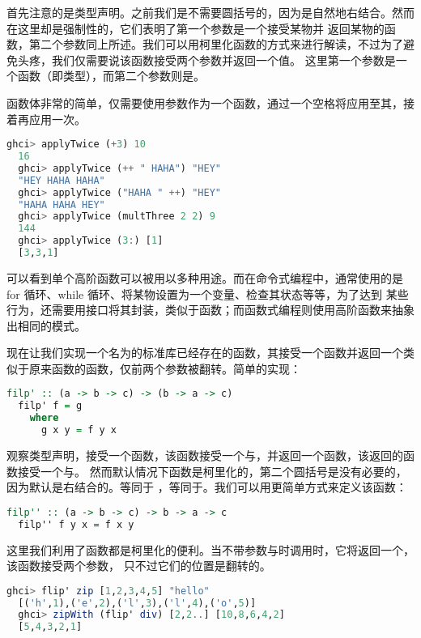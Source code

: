 \documentclass[./main.tex]{subfiles}
\begin{document}
首先注意的是类型声明。之前我们是不需要圆括号的，因为\acode{->}是自然地右结合。然而在这里却是强制性的，它们表明了第一个参数是一个接受某物并
返回某物的函数，第二个参数同上所述。我们可以用柯里化函数的方式来进行解读，不过为了避免头疼，我们仅需要说该函数接受两个参数并返回一个值。
这里第一个参数是一个函数（即类型），而第二个参数则是。

函数体非常的简单，仅需要使用参数作为一个函数，通过一个空格将应用至其，接着再应用一次。

\begin{lstlisting}[language=Haskell]
  ghci> applyTwice (+3) 10
  16
  ghci> applyTwice (++ " HAHA") "HEY"
  "HEY HAHA HAHA"
  ghci> applyTwice ("HAHA " ++) "HEY"
  "HAHA HAHA HEY"
  ghci> applyTwice (multThree 2 2) 9
  144
  ghci> applyTwice (3:) [1]
  [3,3,1]
\end{lstlisting}

可以看到单个高阶函数可以被用以多种用途。而在命令式编程中，通常使用的是 for 循环、while 循环、将某物设置为一个变量、检查其状态等等，为了达到
某些行为，还需要用接口将其封装，类似于函数；而函数式编程则使用高阶函数来抽象出相同的模式。

现在让我们实现一个名为的标准库已经存在的函数，其接受一个函数并返回一个类似于原来函数的函数，仅前两个参数被翻转。简单的实现：

\begin{lstlisting}[language=Haskell]
  filp' :: (a -> b -> c) -> (b -> a -> c)
  filp' f = g
    where
      g x y = f y x
\end{lstlisting}

观察类型声明，接受一个函数，该函数接受一个与，并返回一个函数，该返回的函数接受一个与。
然而默认情况下函数是柯里化的，第二个圆括号是没有必要的，因为\acode{->}默认是右结合的。等同于
，等同于。我们可以用更简单方式来定义该函数：

\begin{lstlisting}[language=Haskell]
  filp'' :: (a -> b -> c) -> b -> a -> c
  filp'' f y x = f x y
\end{lstlisting}

这里我们利用了函数都是柯里化的便利。当不带参数与时调用时，它将返回一个，该函数接受两个参数，
只不过它们的位置是翻转的。

\begin{lstlisting}[language=Haskell]
  ghci> flip' zip [1,2,3,4,5] "hello"
  [('h',1),('e',2),('l',3),('l',4),('o',5)]
  ghci> zipWith (flip' div) [2,2..] [10,8,6,4,2]
  [5,4,3,2,1]
\end{lstlisting}
\end{document}
